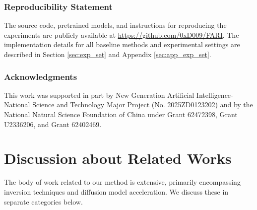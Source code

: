 \documentclass{article}
\begin{document}
\subsubsection*{Reproducibility Statement}
The source code, pretrained models, and instructions for reproducing the experiments are publicly available at \url{https://github.com/0xD009/FARI}. The implementation details for all baseline methods and experimental settings are described in Section \ref{sec:exp_set} and Appendix \ref{sec:app_exp_set}.

\subsubsection*{Acknowledgments}
This work was supported in part by New Generation Artificial Intelligence-National Science and Technology Major Project (No. 2025ZD0123202) and by the National Natural Science Foundation of China under Grant 62472398, Grant U2336206, and Grant 62402469.








\newpage

\appendix

\section{Discussion about Related Works}
\label{sec:app_related}

The body of work related to our method is extensive, primarily encompassing inversion techniques and diffusion model acceleration. We discuss these in separate categories below.
\end{document}
